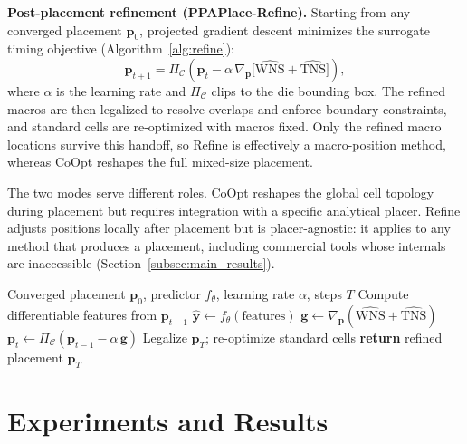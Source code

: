 \documentclass[sigconf,anonymous,review,9pt]{acmart}
\begin{document}
\textbf{Post-placement refinement (PPAPlace-Refine).}
Starting from any converged placement $\mathbf{p}_0$, projected
gradient descent minimizes the surrogate timing objective
(Algorithm~\ref{alg:refine}):
\begin{equation}
\label{eq:refine}
\mathbf{p}_{t+1} = \Pi_\mathcal{C}\!\left(\mathbf{p}_t
  - \alpha\,\nabla_{\mathbf{p}}
  \big[\widehat{\mathrm{WNS}} + \widehat{\mathrm{TNS}}\big]\right),
\end{equation}
where $\alpha$ is the learning rate and $\Pi_\mathcal{C}$ clips to
the die bounding box. The refined macros are then legalized to resolve overlaps and enforce
boundary constraints, and standard cells are re-optimized
with macros fixed. Only the refined macro locations survive this
handoff, so Refine is effectively a macro-position method, whereas
CoOpt reshapes the full mixed-size placement.

The two modes serve different roles. CoOpt reshapes the global cell
topology during placement but requires integration with a specific
analytical placer. Refine adjusts positions locally after placement
but is placer-agnostic: it applies to any method that produces a
placement, including commercial tools whose internals are
inaccessible (Section~\ref{subsec:main_results}).

\begin{algorithm}[h]
\caption{PPAPlace-Refine: Post-Placement Refinement}
\label{alg:refine}
\footnotesize
\begin{algorithmic}[1]
\REQUIRE Converged placement $\mathbf{p}_0$, predictor $f_\theta$,
  learning rate $\alpha$, steps $T$
  \STATE Compute differentiable features from $\mathbf{p}_{t-1}$
  \STATE $\hat{\mathbf{y}} \leftarrow f_\theta(\text{features})$
  \hfill{}
  \STATE $\mathbf{g} \leftarrow \nabla_{\mathbf{p}}
    (\widehat{\mathrm{WNS}} + \widehat{\mathrm{TNS}})$
  \hfill{}
  \STATE $\mathbf{p}_t \leftarrow \Pi_\mathcal{C}(\mathbf{p}_{t-1}
    - \alpha\,\mathbf{g})$
  \hfill{}
\ENDFOR
\STATE Legalize $\mathbf{p}_T$; re-optimize standard cells
\STATE \textbf{return} refined placement $\mathbf{p}_T$
\end{algorithmic}
\end{algorithm}




\section{Experiments and Results}
\label{sec:experiments}
\end{document}
